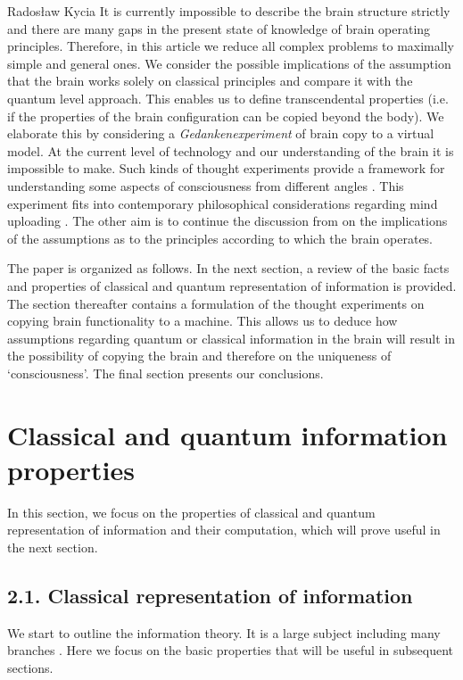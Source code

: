 \begin{artengenv}{Radosław Kycia}
It is currently impossible to describe the brain structure strictly and there are many gaps in the present state of knowledge of brain operating principles. Therefore, in this article we reduce all complex problems to maximally simple and general ones. We consider the possible implications of the assumption that the brain works solely on classical principles and compare it with the quantum level approach. This enables us to define transcendental properties (i.e. if the properties of the brain configuration can be copied beyond the body). We elaborate this by considering a 
\textit{Gedankenexperiment} of brain copy to a virtual model. At the current level of technology and our understanding of the brain it is impossible to make. Such kinds of thought experiments provide a framework for understanding some aspects of consciousness from different angles \parencite{MindUploading2, KurzweilHowToCreateBrain}. This experiment fits into contemporary philosophical considerations regarding mind uploading \parencite{Transhumanizm, MindUploading, MindUploading2}. The other aim is to continue the discussion from \parencite{EmperorsNewMind} on the implications of the assumptions as to the principles according to which the brain operates.

The paper is organized as follows. In the next section, a review of the basic facts and properties of classical and quantum representation of information is provided. The section thereafter contains a formulation of the thought experiments on copying brain functionality to a machine. This allows us to deduce how assumptions regarding quantum or classical information in the brain will result in the possibility of copying the brain and therefore on the uniqueness of `consciousness'. The final section presents our conclusions.



\section{Classical and quantum information properties}
In this section, we focus on the properties of classical and quantum representation of information and their computation, which will prove useful in the next section.



\subsection{2.1. Classical representation of information}
We start to outline the information theory. It is a large subject including many branches \parencite{RezaInformation}. Here we focus on the basic properties that will be useful in subsequent sections.


\end{artengenv}
